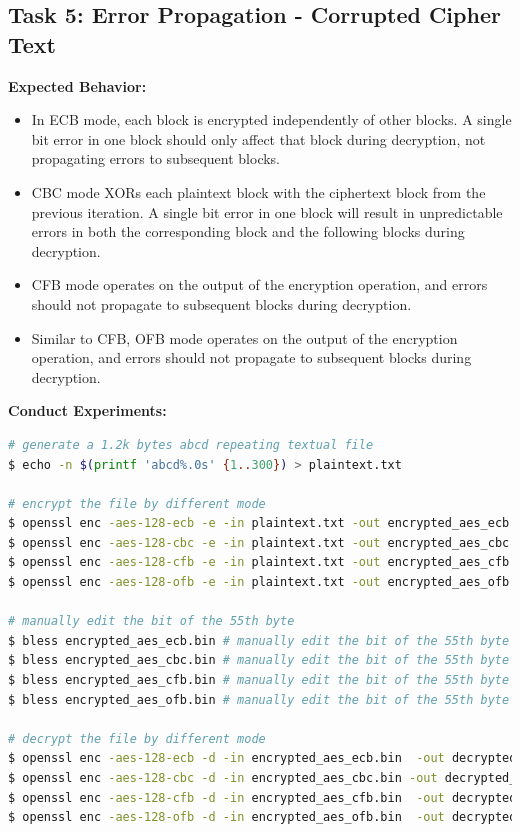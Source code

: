 \documentclass[a4paper]{article}
\begin{document}
\subsection{Task 5: Error Propagation - Corrupted Cipher Text}
\textbf{Expected Behavior:}
\begin{itemize}
    \item  In ECB mode, each block is encrypted independently of other blocks. A single bit error in one block should only affect that block during decryption, not propagating errors to subsequent blocks.
    \item CBC mode XORs each plaintext block with the ciphertext block from the previous iteration. A single bit error in one block will result in unpredictable errors in both the corresponding block and the following blocks during decryption.
    \item CFB mode operates on the output of the encryption operation, and errors should not propagate to subsequent blocks during decryption.
    \item Similar to CFB, OFB mode operates on the output of the encryption operation, and errors should not propagate to subsequent blocks during decryption.
\end{itemize}

\textbf{Conduct Experiments:}
\begin{lstlisting}[caption={TASK\ 2.5\ Command\ Lines},label={lst:task2.5},language=BASH,breaklines=true]
# generate a 1.2k bytes abcd repeating textual file
$ echo -n $(printf 'abcd%.0s' {1..300}) > plaintext.txt

# encrypt the file by different mode
$ openssl enc -aes-128-ecb -e -in plaintext.txt -out encrypted_aes_ecb.bin -K 00112233445566778889aabbccddeeff
$ openssl enc -aes-128-cbc -e -in plaintext.txt -out encrypted_aes_cbc.bin -K 00112233445566778889aabbccddeeff -iv 0102030405060708
$ openssl enc -aes-128-cfb -e -in plaintext.txt -out encrypted_aes_cfb.bin -K 00112233445566778889aabbccddeeff -iv 0102030405060708
$ openssl enc -aes-128-ofb -e -in plaintext.txt -out encrypted_aes_ofb.bin -K 00112233445566778889aabbccddeeff -iv 0102030405060708

# manually edit the bit of the 55th byte
$ bless encrypted_aes_ecb.bin # manually edit the bit of the 55th byte
$ bless encrypted_aes_cbc.bin # manually edit the bit of the 55th byte
$ bless encrypted_aes_cfb.bin # manually edit the bit of the 55th byte
$ bless encrypted_aes_ofb.bin # manually edit the bit of the 55th byte

# decrypt the file by different mode
$ openssl enc -aes-128-ecb -d -in encrypted_aes_ecb.bin  -out decrypted_ecb.txt -K 00112233445566778889aabbccddeeff
$ openssl enc -aes-128-cbc -d -in encrypted_aes_cbc.bin -out decrypted_cbc.txt -K 00112233445566778889aabbccddeeff -iv 0102030405060708
$ openssl enc -aes-128-cfb -d -in encrypted_aes_cfb.bin  -out decrypted_cfb.txt -K 00112233445566778889aabbccddeeff -iv 0102030405060708
$ openssl enc -aes-128-ofb -d -in encrypted_aes_ofb.bin  -out decrypted_ofb.txt -K 00112233445566778889aabbccddeeff -iv 0102030405060708
\end{lstlisting}
\end{document}

